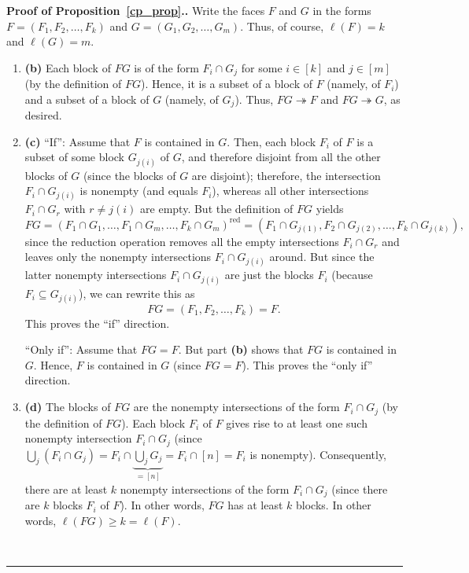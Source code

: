 \documentclass[12pt]{article}
\theoremstyle{definition}%
\theoremstyle{definition}%
\theoremstyle{remark}%
\newcommand{\tup}[1]{\left( #1 \right)}
\newcommand{\interval}[1]{\left[ #1 \right]} %
\newcommand{\red}{\operatorname{red}}
\newcommand{\con}{\twoheadrightarrow} %
\newenvironment{proof}[1][Proof]{\noindent\textbf{#1.} }{\ \rule{0.5em}{0.5em}}
\begin{document}
\begin{proof}[Proof of Proposition~\ref{cp_prop}.]
    Write the faces $F$ and $G$ in the forms
	$F = \tup{F_1, F_2, \ldots, F_k}$ and
	$G = \tup{G_1, G_2, \ldots, G_m}$.
	Thus, of course, $\ell\tup{F} = k$ and $\ell\tup{G} = m$.

    \begin{enumerate}[]
    \item\textbf{(b)} Each block of $FG$ is of the form $F_{i} \cap G_{j}$
    for some $i \in \interval{k}$ and $j \in \interval{m}$ (by the definition of $FG$).
	Hence, it is a subset of a block of $F$ (namely, of $F_{i}$)
	and a subset of a block of $G$ (namely, of $G_{j}$).
	Thus, $FG \con F$ and $FG \con G$, as desired.

    \item\textbf{(c)} ``If'': Assume that $F$ is contained in $G$.
    Then, each block $F_i$ of $F$ is a subset of some block
    $G_{j\tup{i}}$ of $G$,
    and therefore disjoint from all the other blocks of $G$
    (since the blocks of $G$ are disjoint); therefore,
    the intersection $F_i \cap G_{j\tup{i}}$ is nonempty (and
    equals $F_i$),
    whereas all other intersections
	$F_i \cap G_r$ with $r \neq j \tup{i}$ are empty.
    But the definition of $FG$ yields
    \[
            FG = \tup{F_{1} \cap G_{1}, \dots, F_{1} \cap G_m, \dots, F_k \cap G_m}^{\red}
            = \tup{F_1 \cap G_{j\tup{1}}, F_2 \cap G_{j\tup{2}}, \dots, F_k \cap G_{j\tup{k}}},
    \]
    since the reduction operation removes all the empty intersections
    $F_i \cap G_r$ and leaves only the nonempty intersections
    $F_i \cap G_{j\tup{i}}$ around. But since the latter nonempty
    intersections $F_i \cap G_{j\tup{i}}$ are just the blocks $F_i$
    (because $F_i \subseteq G_{j\tup{i}}$), we can rewrite this as
    \[
            FG = \tup{F_1, F_2, \dots, F_k} = F.
    \]
    This proves the ``if'' direction.
    
    ``Only if'': Assume that $FG = F$. But part \textbf{(b)} shows
	that $FG$ is contained in $G$.
	Hence, $F$ is contained in $G$ (since $FG = F$).
    This proves the ``only if'' direction.

    \item\textbf{(d)} The blocks of $FG$ are the nonempty intersections of the
    form $F_{i}\cap G_{j}$ (by the definition of $FG$).
    Each block $F_{i}$ of $F$ gives rise to at least one
    such nonempty intersection $F_{i}\cap G_{j}$ (since $\bigcup\limits_{j}\left(
    F_{i}\cap G_{j}\right)  = F_i \cap \underbrace{\bigcup\limits_j G_j}_{= \interval{n}}
    = F_i \cap \interval{n} = F_{i}$ is nonempty). Consequently, there are at least
    $k$ nonempty intersections of the form $F_{i}\cap G_{j}$ (since there are
    $k$ blocks $F_i$ of $F$).
    In other words, $FG$ has at least $k$ blocks.
    In other words, $\ell\tup{FG} \ge k = \ell\tup{F}$.
    

\end{enumerate}
\end{proof}
\end{document}
